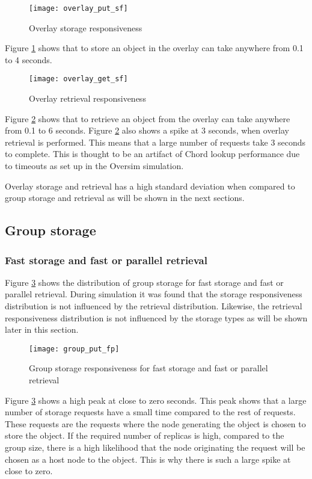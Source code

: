 \begin{figure}[htbp]
 \centering
 \texttt{[image: overlay\_put\_sf]}
 \caption{Overlay storage responsiveness}
 \label{fig_overlay_put_sf}
\end{figure}
%
Figure \ref{fig_overlay_put_sf} shows that to store an object in the overlay can take anywhere from 0.1 to 4 seconds.

\begin{figure}[htbp]
 \centering
 \texttt{[image: overlay\_get\_sf]}
 \caption{Overlay retrieval responsiveness}
 \label{fig_overlay_get_sf}
\end{figure}
%
Figure \ref{fig_overlay_get_sf} shows that to retrieve an object from the overlay can take anywhere from 0.1 to 6 seconds. Figure \ref{fig_overlay_get_sf} also shows a spike at 3 seconds, when overlay retrieval is performed. This means that a large number of requests take 3 seconds to complete. This is thought to be an artifact of Chord lookup performance due to timeouts as set up in the Oversim simulation.

Overlay storage and retrieval has a high standard deviation when compared to group storage and retrieval as will be shown in the next sections.


\subsection{Group storage}
\label{group_storage_eval}

\subsubsection{Fast storage and fast or parallel retrieval}
\label{group_put_f_fp}

Figure \ref{fig_group_put_fp} shows the distribution of group storage for fast storage and fast or parallel retrieval. During simulation it was found that the storage responsiveness distribution is not influenced by the retrieval distribution. Likewise, the retrieval responsiveness distribution is not influenced by the storage types as will be shown later in this section.

\begin{figure}[htbp]
 \centering
 \texttt{[image: group\_put\_fp]}
 \caption{Group storage responsiveness for fast storage and fast or parallel retrieval}
 \label{fig_group_put_fp}
\end{figure}
%
Figure \ref{fig_group_put_fp} shows a high peak at close to zero seconds. This peak shows that a large number of storage requests have a small time compared to the rest of requests. These requests are the requests where the node generating the object is chosen to store the object. If the required number of replicas is high, compared to the group size, there is a high likelihood that the node originating the request will be chosen as a host node to the object. This is why there is such a large spike at close to zero.

